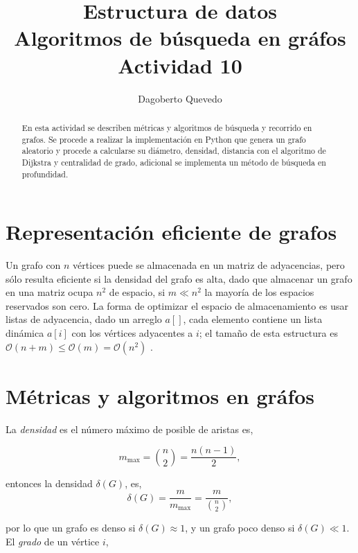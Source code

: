 \documentclass[letterpaper,11pt]{article}
\begin{document}
\title{Estructura de datos\\\Large Algoritmos de búsqueda en gráfos\\\small Actividad 10}
\author{Dagoberto Quevedo}
\maketitle

\begin{abstract}
En esta actividad se describen métricas y algoritmos de búsqueda y recorrido en grafos. Se procede a realizar la implementación en Python que genera un grafo aleatorio y procede a calcularse su diámetro, densidad, distancia con el algoritmo de Dijkstra y centralidad de grado, adicional se implementa un método de búsqueda en profundidad.
\end{abstract}

\section{Representación eficiente de grafos}

Un grafo con $n$ vértices puede se almacenada en un matriz de adyacencias, pero sólo resulta eficiente si la densidad del grafo es alta, dado que almacenar un grafo en una matriz ocupa $n^2$ de espacio, si $m\ll n^2$ la mayoría de los espacios reservados son cero. La forma de optimizar el espacio de almacenamiento es usar listas de adyacencia, dado un arreglo $a[]$, cada elemento contiene un lista dinámica $a[i]$ con los vértices adyacentes a $i$; el tamaño de esta estructura es $\mathcal{O}(n+m)\leq \mathcal{O}(m) = \mathcal{O}(n^2)$ \cite{Schaeffer2020}. 

\section{Métricas y algoritmos en gráfos}

La \textit{densidad} es el número máximo de posible de aristas es,

\begin{equation}
m_{\max} = \binom{n}{2} = \frac{n(n-1)}{2}, 
\end{equation}

entonces la densidad $\delta(G)$, es,
\begin{equation}
\delta(G) = \frac{m}{m_{\max}} = \frac{m}{\binom{n}{2}},
\label{eq:densidad}
\end{equation}

por lo que un grafo es denso si $\delta(G)\approx 1$, y un grafo poco denso si $\delta(G) \ll 1$. El \textit{grado}  de un vértice $i$,
\end{document}
